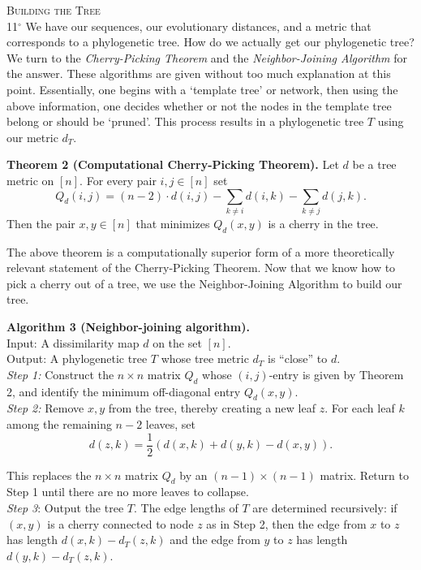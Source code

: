 \documentclass[a4paper]{article}
\begin{document}
\textsc{Building the Tree} \\

11$^\circ$ We have our sequences, our evolutionary distances, and a metric that corresponds to a phylogenetic tree. How do we actually get our phylogenetic tree? We turn to the \emph{Cherry-Picking Theorem} and the \emph{Neighbor-Joining Algorithm} for the answer. These algorithms are given without too much explanation at this point. Essentially, one begins with a `template tree' or network, then using the above information, one decides whether or not the nodes in the template tree belong or should be `pruned'. This process results in a phylogenetic tree $T$ using our metric $d_T$. \\

\begin{adjustwidth}{.5in}{0pt}
\textbf{Theorem 2 (Computational Cherry-Picking Theorem).} Let $d$ be a tree metric on $[n]$. For every pair $i,j \in [n]$ set
\[ Q_d(i,j) = (n-2) \cdot d(i,j) - \sum_{k \neq i} d(i,k) - \sum_{k \neq j} d(j,k). \] 
Then the pair $x,y \in [n]$ that minimizes $Q_d(x,y)$ is a cherry in the tree. \\ 
\end{adjustwidth}

The above theorem is a computationally superior form of a more theoretically relevant statement of the Cherry-Picking Theorem. Now that we know how to pick  a cherry out of a tree, we use the Neighbor-Joining Algorithm to build our tree. \\

\newpage

\begin{adjustwidth}{.5in}{0pt}
\textbf{Algorithm 3 (Neighbor-joining algorithm).} \\
Input: A dissimilarity map $d$ on the set $[n]$. \\
Output: A phylogenetic tree $T$ whose tree metric $d_T$ is ``close'' to $d$. \\

\emph{Step 1:} Construct the $n \times n$ matrix $Q_d$ whose $(i,j)$-entry is given by Theorem 2, and identify the minimum off-diagonal entry $Q_d(x,y)$. \\

\emph{Step 2:} Remove $x,y$ from the tree, thereby creating a new leaf $z$. For each leaf $k$ among the remaining $n - 2$ leaves, set
\[ d(z,k) = \frac{1}{2}(d(x,k) + d(y,k) - d(x,y)). \]

This replaces the $n \times n$ matrix $Q_d$ by an $(n -1) \times (n-1)$ matrix. Return to Step 1 until there are no more leaves to collapse. \\

\emph{Step 3}: Output the tree $T$. The edge lengths of $T$ are determined recursively: if $(x,y)$ is a cherry connected to node $z$ as in Step 2, then the edge from $x$ to $z$ has length $d(x,k) - d_T(z,k)$ and the edge from $y$ to $z$ has length $d(y,k) - d_T(z,k)$. \\
\end{adjustwidth}
\end{document}
